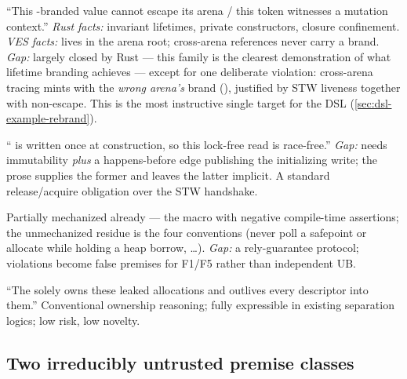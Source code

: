 \begin{obligationbox}
``This -branded value cannot escape its arena / this token
witnesses a mutation context.'' \emph{Rust facts:} invariant lifetimes,
private constructors,  closure confinement. \emph{VES
facts:}  lives in the arena root; cross-arena
references never carry a brand. \emph{Gap:} largely closed by Rust ---
this family is the clearest demonstration of what lifetime branding
achieves --- except for one deliberate violation: cross-arena tracing
mints  with the \emph{wrong arena's} brand
(), justified by STW liveness together with
non-escape. This is the most instructive single target for the DSL
(\cref{sec:dsl-example-rebrand}).
\end{obligationbox}

\begin{obligationbox}
`` is written once at construction, so this lock-free
read is race-free.'' \emph{Gap:} needs immutability \emph{plus} a
happens-before edge publishing the initializing write; the prose
supplies the former and leaves the latter implicit. A standard
release/acquire obligation over the STW handshake.
\end{obligationbox}

\begin{obligationbox}
Partially mechanized already --- the 
macro with negative compile-time assertions; the unmechanized residue is the four
 conventions (never poll a safepoint or allocate
while holding a heap borrow, \dots). \emph{Gap:} a rely-guarantee
protocol; violations become false premises for F1/F5 rather than
independent UB.
\end{obligationbox}

\begin{obligationbox}
``The  solely owns these leaked allocations and
outlives every descriptor into them.'' Conventional ownership reasoning;
fully expressible in existing separation logics; low risk, low novelty.
\end{obligationbox}

\subsection{Two irreducibly untrusted premise classes}
\label{sec:obligations-untrusted}

